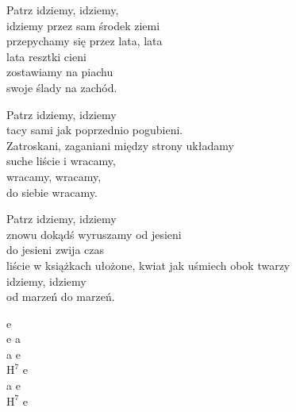 \begin{text}
    Patrz idziemy, idziemy,\\
    idziemy przez sam środek ziemi\\
    przepychamy się przez lata, lata\\
    lata resztki cieni\\
    zostawiamy na piachu\\
    swoje ślady na zachód.

    Patrz idziemy, idziemy\\
    tacy sami jak poprzednio pogubieni.\\
    Zatroskani, zaganiani między strony układamy\\
    suche liście i wracamy,\\
    wracamy, wracamy,\\
    do siebie wracamy.

    Patrz idziemy, idziemy\\
    znowu dokądś wyruszamy od jesieni\\
    do jesieni zwija czas\\
    liście w książkach ułożone, kwiat jak uśmiech obok twarzy\\
    idziemy, idziemy\\
    od marzeń do marzeń.
\end{text}
\begin{chord}
    e\\
    e a\\
    a e\\
    $\mathrm{H^7}$ e\\
    a e\\
    $\mathrm{H^7}$ e
\end{chord}
